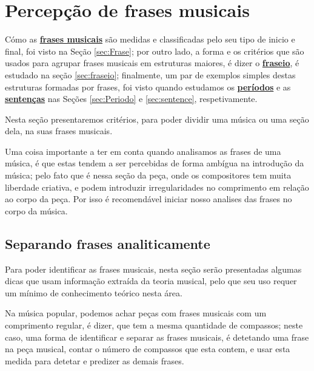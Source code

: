 \section{Percepção de frases musicais}
\label{sec:perceberfrases}

Cómo as \hyperref[sec:Frase]{\textbf{frases musicais}} são medidas e classificadas pelo seu tipo de inicio e final,
foi visto na Seção \ref{sec:Frase};
por outro lado, a forma e os critérios que são usados para agrupar frases musicais em estruturas maiores, 
é dizer o \hyperref[sec:fraseio]{\textbf{fraseio}}, 
é estudado na seção \ref{sec:fraseio};
finalmente, um par de exemplos simples destas estruturas formadas por frases,
foi visto quando estudamos os \hyperref[sec:Periodo]{\textbf{períodos}} e 
as \hyperref[sec:sentence]{\textbf{sentenças}} nas Seções \ref{sec:Periodo} e \ref{sec:sentence}, 
respetivamente.

Nesta seção presentaremos critérios, para poder dividir uma música ou uma seção dela,
na suas frases musicais. 


\begin{tcbattention}
Uma coisa importante a ter em conta quando analisamos as frases de uma música,
é que estas tendem a ser percebidas de forma ambígua na introdução da música;
pelo fato que é nessa seção da peça, onde os compositores tem muita liberdade criativa,
e podem introduzir irregularidades no comprimento em relação ao corpo da peça. 
Por isso é recomendável iniciar nosso analises das frases no corpo da música. 
\end{tcbattention}

\subsection{Separando frases analiticamente}

Para poder identificar as frases musicais, 
nesta seção serão presentadas algumas dicas que usam informação extraída da teoria musical,
pelo que seu uso requer um mínimo de conhecimento teórico nesta área. 




Na música popular, podemos achar peças com frases musicais com um comprimento regular,
é dizer, que  tem a mesma quantidade de compassos;
neste caso, uma forma de identificar e separar as frases musicais, 
é detetando uma frase na peça musical,
contar o número de compassos que esta contem, 
e usar esta medida para detetar e predizer as demais frases.


